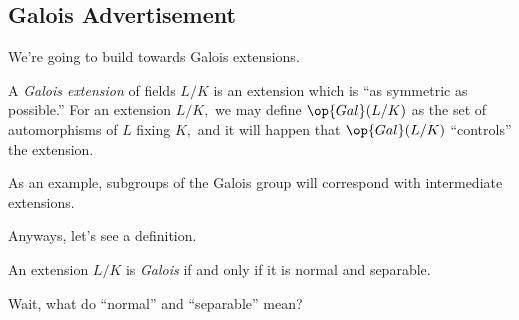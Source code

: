 \subsection{Galois Advertisement}
We're going to build towards Galois extensions.
\begin{idea}
	A \textit{Galois extension} of fields $L/K$ is an extension which is ``as symmetric as possible.'' For an extension $L/K,$ we may define $\op{Gal}(L/K)$ as the set of automorphisms of $L$ fixing $K,$ and it will happen that $\op{Gal}(L/K)$ ``controls'' the extension.
\end{idea}
As an example, subgroups of the Galois group will correspond with intermediate extensions.

Anyways, let's see a definition.
\begin{definition} \label{defi:gali}
	An extension $L/K$ is \textit{Galois} if and only if it is normal and separable.
\end{definition}
Wait, what do ``normal'' and ``separable'' mean?

